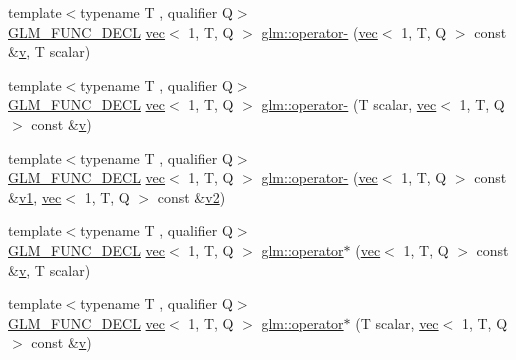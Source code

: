 \begin{DoxyCompactItemize}
\item 
{\footnotesize template$<$typename T , qualifier Q$>$ }\\\mbox{\hyperlink{setup_8hpp_ab2d052de21a70539923e9bcbf6e83a51}{G\+L\+M\+\_\+\+F\+U\+N\+C\+\_\+\+D\+E\+CL}} \mbox{\hyperlink{structglm_1_1vec}{vec}}$<$ 1, T, Q $>$ \mbox{\hyperlink{group__ext__vec1_ga8069f3e0f8b424bda71c65bdadaaf73c}{glm\+::operator-\/}} (\mbox{\hyperlink{structglm_1_1vec}{vec}}$<$ 1, T, Q $>$ const \&\mbox{\hyperlink{_s_d_l__opengl_8h_a10a82eabcb59d2fcd74acee063775f90}{v}}, T scalar)
\item 
{\footnotesize template$<$typename T , qualifier Q$>$ }\\\mbox{\hyperlink{setup_8hpp_ab2d052de21a70539923e9bcbf6e83a51}{G\+L\+M\+\_\+\+F\+U\+N\+C\+\_\+\+D\+E\+CL}} \mbox{\hyperlink{structglm_1_1vec}{vec}}$<$ 1, T, Q $>$ \mbox{\hyperlink{group__ext__vec1_gad9a7982cee48942a4832b505993b7851}{glm\+::operator-\/}} (T scalar, \mbox{\hyperlink{structglm_1_1vec}{vec}}$<$ 1, T, Q $>$ const \&\mbox{\hyperlink{_s_d_l__opengl_8h_a10a82eabcb59d2fcd74acee063775f90}{v}})
\item 
{\footnotesize template$<$typename T , qualifier Q$>$ }\\\mbox{\hyperlink{setup_8hpp_ab2d052de21a70539923e9bcbf6e83a51}{G\+L\+M\+\_\+\+F\+U\+N\+C\+\_\+\+D\+E\+CL}} \mbox{\hyperlink{structglm_1_1vec}{vec}}$<$ 1, T, Q $>$ \mbox{\hyperlink{group__ext__vec1_gae339bd1ed8702767da0b5faacbc860ce}{glm\+::operator-\/}} (\mbox{\hyperlink{structglm_1_1vec}{vec}}$<$ 1, T, Q $>$ const \&\mbox{\hyperlink{_s_d_l__opengl__glext_8h_a435c176a02c061b43e19bdf7c86cceae}{v1}}, \mbox{\hyperlink{structglm_1_1vec}{vec}}$<$ 1, T, Q $>$ const \&\mbox{\hyperlink{_s_d_l__opengl__glext_8h_a0928f6d0f0f794ba000a21dfae422136}{v2}})
\item 
{\footnotesize template$<$typename T , qualifier Q$>$ }\\\mbox{\hyperlink{setup_8hpp_ab2d052de21a70539923e9bcbf6e83a51}{G\+L\+M\+\_\+\+F\+U\+N\+C\+\_\+\+D\+E\+CL}} \mbox{\hyperlink{structglm_1_1vec}{vec}}$<$ 1, T, Q $>$ \mbox{\hyperlink{group__ext__vec1_ga3831734bcbc3a7d64ddce316291d7a31}{glm\+::operator$\ast$}} (\mbox{\hyperlink{structglm_1_1vec}{vec}}$<$ 1, T, Q $>$ const \&\mbox{\hyperlink{_s_d_l__opengl_8h_a10a82eabcb59d2fcd74acee063775f90}{v}}, T scalar)
\item 
{\footnotesize template$<$typename T , qualifier Q$>$ }\\\mbox{\hyperlink{setup_8hpp_ab2d052de21a70539923e9bcbf6e83a51}{G\+L\+M\+\_\+\+F\+U\+N\+C\+\_\+\+D\+E\+CL}} \mbox{\hyperlink{structglm_1_1vec}{vec}}$<$ 1, T, Q $>$ \mbox{\hyperlink{group__ext__vec1_ga83636331813fdbfe423afc01de1f38aa}{glm\+::operator$\ast$}} (T scalar, \mbox{\hyperlink{structglm_1_1vec}{vec}}$<$ 1, T, Q $>$ const \&\mbox{\hyperlink{_s_d_l__opengl_8h_a10a82eabcb59d2fcd74acee063775f90}{v}})

\end{DoxyCompactItemize}
